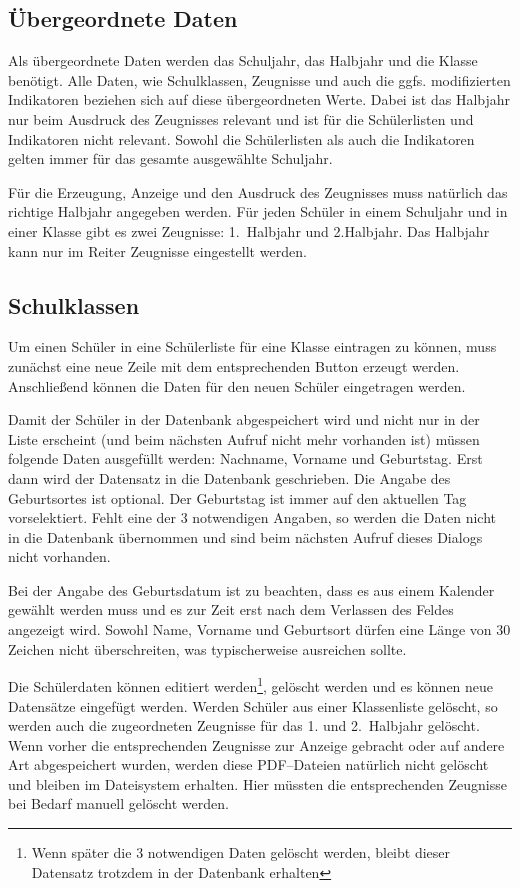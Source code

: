 \documentclass[a4paper,notitlepage,parskip]{scrartcl}
\newcommand\ott{\normalfont\ttfamily}
\begin{document}
\subsection{Übergeordnete Daten}
Als übergeordnete Daten werden das Schuljahr, das Halbjahr und die Klasse benötigt.
Alle Daten, wie Schulklassen, Zeugnisse und auch die ggfs. modifizierten Indikatoren beziehen sich auf diese übergeordneten Werte. Dabei ist das Halbjahr nur beim Ausdruck des Zeugnisses relevant und ist für die Schülerlisten und Indikatoren nicht relevant. Sowohl die Schülerlisten als auch die Indikatoren gelten immer für das gesamte ausgewählte Schuljahr.

Für die Erzeugung, Anzeige und den Ausdruck des Zeugnisses muss natürlich das richtige Halbjahr angegeben werden.
Für jeden Schüler in einem Schuljahr und in einer Klasse gibt es zwei Zeugnisse: 1.~Halbjahr und 2.Halbjahr. Das Halbjahr kann nur im Reiter {\ott Zeugnisse} eingestellt werden.

\subsection{Schulklassen}

Um einen Schüler in eine Schülerliste für eine Klasse eintragen zu können, muss zunächst eine neue Zeile mit dem entsprechenden Button erzeugt werden. Anschließend können die Daten für den neuen Schüler eingetragen werden. 

Damit der Schüler in der Datenbank abgespeichert wird und nicht nur in der Liste erscheint (und beim nächsten Aufruf nicht mehr vorhanden ist) müssen folgende Daten ausgefüllt werden: {\ott Nachname}, {\ott Vorname} und {\ott Geburtstag}. Erst dann wird der Datensatz in die Datenbank geschrieben. Die Angabe des Geburtsortes ist optional. Der {\ott Geburtstag} ist immer auf den aktuellen Tag vorselektiert.
Fehlt eine der 3 notwendigen Angaben, so werden die Daten nicht in die Datenbank übernommen und sind beim nächsten Aufruf dieses Dialogs nicht vorhanden.

Bei der Angabe des Geburtsdatum ist zu beachten, dass es aus einem Kalender gewählt werden muss und es zur Zeit erst nach dem Verlassen des Feldes angezeigt wird.
Sowohl Name, Vorname und Geburtsort dürfen eine Länge von 30 Zeichen nicht überschreiten, was typischerweise ausreichen sollte. 

Die Schülerdaten können editiert werden\footnote{Wenn später die 3 notwendigen Daten gelöscht werden, bleibt dieser Datensatz trotzdem in der Datenbank erhalten}, gelöscht werden und es können neue Datensätze eingefügt werden. Werden Schüler aus einer Klassenliste gelöscht, so werden auch die zugeordneten Zeugnisse für das 1. und 2.~Halbjahr gelöscht.
Wenn vorher die entsprechenden Zeugnisse zur Anzeige gebracht oder auf andere Art abgespeichert wurden, werden diese PDF--Dateien natürlich nicht gelöscht und bleiben im Dateisystem erhalten. Hier müssten die entsprechenden Zeugnisse bei Bedarf manuell gelöscht werden.
\end{document}
